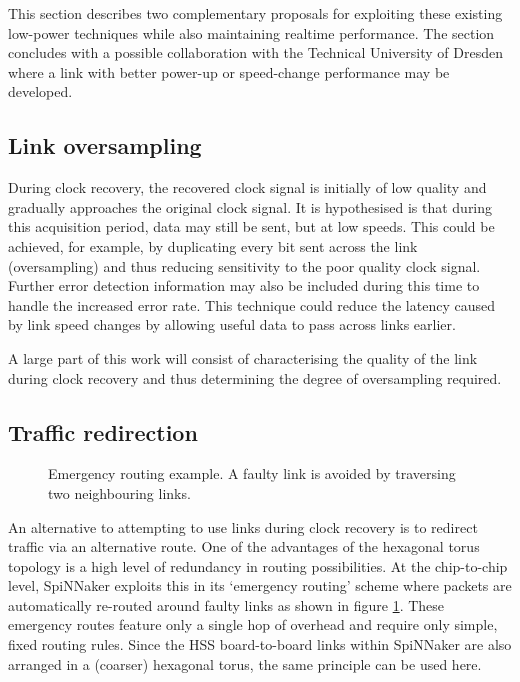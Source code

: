 		This section describes two complementary proposals for exploiting these
		existing low-power techniques while also maintaining realtime performance.
		The section concludes with a possible collaboration with the Technical
		University of Dresden where a link with better power-up or speed-change
		performance may be developed.
		
		\subsection{Link oversampling}
			
			
			During clock recovery, the recovered clock signal is initially of low
			quality and gradually approaches the original clock signal. It is
			hypothesised is that during this acquisition period, data may still be
			sent, but at low speeds. This could be achieved, for example, by
			duplicating every bit sent across the link (oversampling) and thus
			reducing sensitivity to the poor quality clock signal.  Further error
			detection information may also be included during this time to handle the
			increased error rate. This technique could reduce the latency caused by
			link speed changes by allowing useful data to pass across links earlier.
			
			A large part of this work will consist of characterising the quality of
			the link during clock recovery and thus determining the degree of
			oversampling required.
		
		\subsection{Traffic redirection}
			
			
			\begin{figure}
				\center
				
				
				\caption[Emergency routing example.]{Emergency routing example. A
				faulty link is avoided by traversing two neighbouring links.}
				\label{fig:emergency-routing}
			\end{figure}
			
			An alternative to attempting to use links during clock recovery is to
			redirect traffic via an alternative route. One of the advantages of the
			hexagonal torus topology is a high level of redundancy in routing
			possibilities.  At the chip-to-chip level, SpiNNaker exploits this in its
			`emergency routing' scheme where packets are automatically re-routed
			around faulty links as shown in figure \ref{fig:emergency-routing}. These
			emergency routes feature only a single hop of overhead and require only
			simple, fixed routing rules. Since the HSS board-to-board links within
			SpiNNaker are also arranged in a (coarser) hexagonal torus, the same
			principle can be used here.
			
